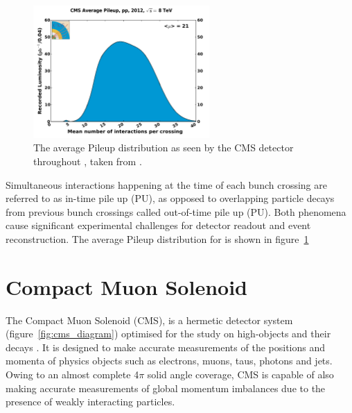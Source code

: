 \begin{figure}
  \centering
  \includegraphics[width=0.6\textwidth]{Figs/machine/pileup_pp_2012.pdf}
  \caption{The average Pileup distribution as seen by the CMS detector
  throughout \runone, taken from \cite{cmslumi}.}
  \label{fig:pileup_runone}
\end{figure}

Simultaneous interactions happening at the time
of each bunch crossing are referred to as in-time pile up (PU), as opposed to 
overlapping particle decays from previous bunch crossings called out-of-time 
pile up (PU). Both phenomena cause significant
experimental challenges for detector readout and event reconstruction.
The average Pileup distribution for \runone is shown in
figure~\ref{fig:pileup_runone}




\section{Compact Muon Solenoid}  %
\label{sec:detector_overview}

The Compact Muon Solenoid (CMS), is a
hermetic detector system (figure~\ref{fig:cms_diagram})
optimised for the study on high-\Pt objects and their decays \cite
{CMSexperiment}.
It is designed to make accurate measurements of the positions and momenta of
physics objects such as electrons, muons, taus,
photons and jets. Owing to an almost complete 4$\pi$ solid angle coverage, CMS is 
capable of also making accurate measurements of global momentum imbalances due
to the presence of weakly interacting particles.

